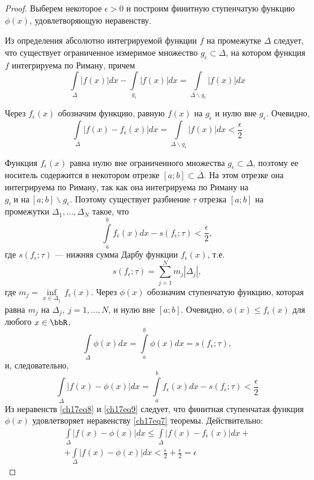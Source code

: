 \begin{proof}
Выберем некоторое $\epsilon > 0$ и построим финитную ступенчатую функцию $\phi(x)$, удовлетворяющую неравенству.

Из определения абсолютно интегрируемой функции $f$ на промежутке $\Delta$ следует, что существует ограниченное измеримое множество $g_{\epsilon} \subset \Delta$, на котором функция $f$ интегрируема по Риману, причем
$$
\int\limits_{\Delta} |f(x)|dx - \int\limits_{g_{\epsilon}} |f(x)|dx = \int\limits_{\Delta\backslash g_{\epsilon}} |f(x)|dx
$$

Через $f_{\epsilon}(x)$ обозначим функцию, равную $f(x)$ на $g_{\epsilon}$ и нулю вне $g_{\epsilon}$. Очевидно,
\begin{equation} \label{ch17eq8}
\int\limits_{\Delta} |f(x) - f_{\epsilon}(x)|dx = \int\limits_{\Delta\backslash g_{\epsilon}} |f(x)|dx < \frac{\epsilon}{2}
\end{equation}

Функция $f_{\epsilon}(x)$ равна нулю вне ограниченного множества $g_{\epsilon} \subset \Delta$, поэтому ее носитель содержится в некотором отрезке $[a;b] \subset \overline{\Delta}$. На этом отрезке она интегрируема по Риману, так как она интегрируема по Риману на $g_{\epsilon}\ \text{и на}\ [a;b]\backslash g_{\epsilon}$. Поэтому существует разбиение $\tau$ отрезка $[a;b]$ на промежутки $\Delta_1,\ldots,\Delta_N$ такое, что
$$
\int\limits_{a}^{b} f_{\epsilon}(x)dx - s(f_{\epsilon};\tau) < \frac{\epsilon}{2},
$$
где $s(f_{\epsilon};\tau)$ --- нижняя сумма Дарбу функции $f_{\epsilon}(x)$, т.е.
$$
s(f_{\epsilon};\tau) = \sum_{j = 1}^{N} m_{j}|\Delta_j|,
$$
где $m_j = \inf\limits_{x \in \Delta_j}\,f_{\epsilon}(x)$. Через $\phi(x)$ обозначим ступенчатую функцию, которая равна $m_j$ на $\Delta_j,\ j = 1,\ldots,N$, и нулю вне $[a;b]$. Очевидно, $\phi(x) \le f_{\epsilon}(x)$ для любого $x \in \bbR$,
$$
\int\limits_{\Delta} \phi(x)dx = \int\limits_{a}^{b} \phi(x)dx = s(f_{\epsilon};\tau),
$$
и, следовательно,
\begin{equation} \label{ch17eq9}
\int\limits_{\Delta} |f(x) - \phi(x)|dx = \int\limits_{a}^{b} f_{\epsilon}(x)dx - s(f_{\epsilon};\tau) < \frac{\epsilon}{2}
\end{equation}
Из неравенств \eqref{ch17eq8} и \eqref{ch17eq9} следует, что финитная ступенчатая функция $\phi(x)$ удовлетворяет неравенству \eqref{ch17eq7} теоремы. Действительно:
\begin{multline*}
\int\limits_{\Delta} |f(x) - \phi(x)|dx \le \int\limits_{\Delta} |f(x) - f_{\epsilon}(x)|dx+\\
+\int\limits_{\Delta} |f(x) - \phi(x)|dx < \frac{\epsilon}{2} + \frac{\epsilon}{2} = \epsilon
\end{multline*}
\end{proof}

